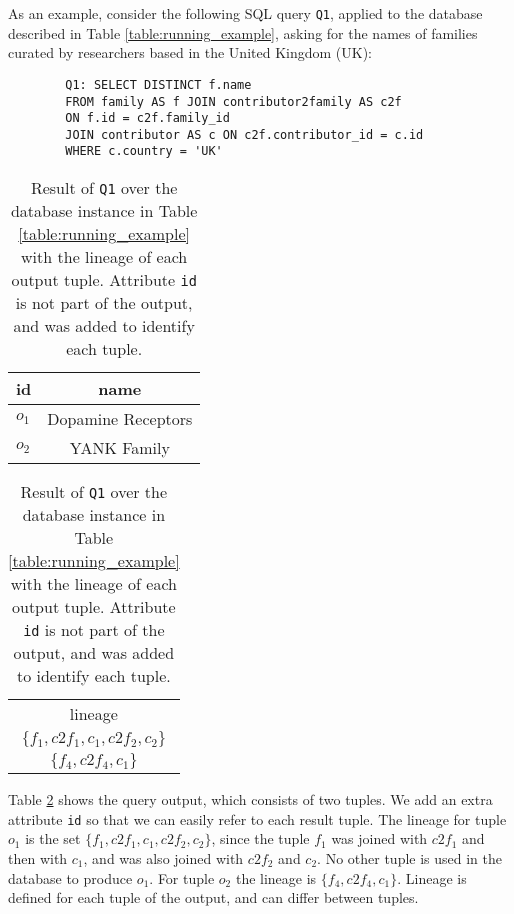 As an example, consider the following SQL query \texttt{Q1}, applied to the database described in Table \ref{table:running_example}, asking for the names of families curated by researchers based in the United Kingdom (UK):

\vspace{2mm}
{\footnotesize
\begin{adjustwidth}{25pt}{0pt}
\begin{verbatim}
		Q1: SELECT DISTINCT f.name
		FROM family AS f JOIN contributor2family AS c2f 
		ON f.id = c2f.family_id
		JOIN contributor AS c ON c2f.contributor_id = c.id
		WHERE c.country = 'UK'
\end{verbatim}	
\end{adjustwidth}
}
\vspace{2mm}

\begin{table}[hbt]
\centering
  \begin{tabular}{|l||c|}
  \hline
    id & name\\
    \hline
    $o_1$ &  Dopamine Receptors\\
    $o_2$ & YANK Family\\
    \hline
  \end{tabular}
  \begin{tabular}{c}
  	lineage   \\
  	$\{f_1, c2f_1, c_1, c2f_2, c_2\}$ \\
  	$\{ f_4, c2f_4, c_1\}$ \\
  \end{tabular}
    \caption{Result of \texttt{Q1} over the database instance in Table \ref{table:running_example} with the lineage of each output tuple. %
    Attribute \texttt{id} is not part of the output, and was added to identify each tuple.}
  \label{table:result}
\end{table}

Table \ref{table:result} shows the query output, which consists of two tuples. We add an extra  attribute \texttt{id} so that we can easily refer to each result tuple.  
The lineage for tuple $o_1$ is the set $\{f_1, c2f_1, c_1, c2f_2, c_2\}$, since the tuple $f_1$ was joined with $c2f_1$ and then with $c_1$, and was also joined with $c2f_2$ and $c_2$. No other tuple is used in the database to produce $o_1$.
For tuple $o_2$ the lineage is $\{ f_4, c2f_4, c_1\}$.
Lineage is defined for each tuple of the output, and can differ between tuples.

